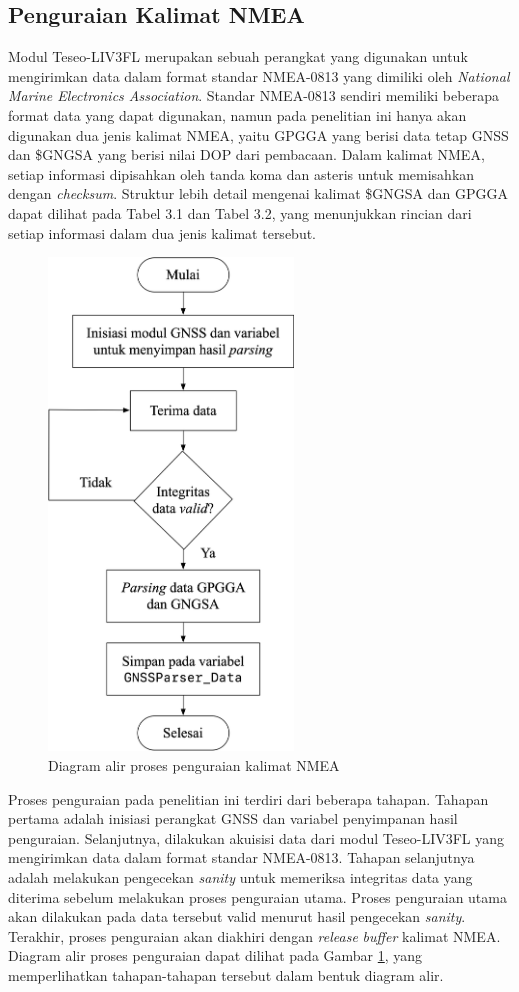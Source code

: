 \subsection{Penguraian Kalimat NMEA}
Modul Teseo\hyp{}LIV3FL merupakan sebuah perangkat yang digunakan untuk mengirimkan data dalam format standar NMEA-0813 yang dimiliki oleh \textit{National Marine Electronics Association}. Standar NMEA-0813 sendiri memiliki beberapa format data yang dapat digunakan, namun pada penelitian ini hanya akan digunakan dua jenis kalimat NMEA, yaitu GPGGA yang berisi data tetap GNSS dan \$GNGSA yang berisi nilai DOP dari pembacaan. Dalam kalimat NMEA, setiap informasi dipisahkan oleh tanda koma dan asteris untuk memisahkan dengan \textit{checksum}. Struktur lebih detail mengenai kalimat \$GNGSA dan GPGGA dapat dilihat pada Tabel 3.1 dan Tabel 3.2, yang menunjukkan rincian dari setiap informasi dalam dua jenis kalimat tersebut.

\begin{figure}[H]
	\centering
	\includegraphics[width=6.5cm]{contents/chapter-3/diagram-parser.png}
	\caption{Diagram alir proses penguraian kalimat NMEA}
	\label{Fig: flowchart-parsing}
\end{figure}

Proses penguraian pada penelitian ini terdiri dari beberapa tahapan. Tahapan pertama adalah inisiasi perangkat GNSS dan variabel penyimpanan hasil penguraian. Selanjutnya, dilakukan akuisisi data dari modul Teseo\hyp{}LIV3FL yang mengirimkan data dalam format standar NMEA-0813. Tahapan selanjutnya adalah melakukan pengecekan \textit{sanity} untuk memeriksa integritas data yang diterima sebelum melakukan proses penguraian utama. Proses penguraian utama akan dilakukan pada data tersebut valid menurut hasil pengecekan \textit{sanity}. Terakhir, proses penguraian akan diakhiri dengan \textit{release} \textit{buffer} kalimat NMEA. Diagram alir proses penguraian dapat dilihat pada Gambar \ref{Fig: flowchart-parsing}, yang memperlihatkan tahapan-tahapan tersebut dalam bentuk diagram alir.

